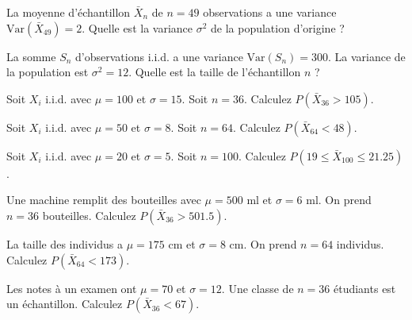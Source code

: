 \begin{exercicebox}
La moyenne d'échantillon $\bar{X}_n$ de $n=49$ observations a une variance $\text{Var}(\bar{X}_{49}) = 2$.
Quelle est la variance $\sigma^2$ de la population d'origine ?
\end{exercicebox}

\begin{exercicebox}
La somme $S_n$ d'observations i.i.d. a une variance $\text{Var}(S_n) = 300$. La variance de la population est $\sigma^2 = 12$.
Quelle est la taille de l'échantillon $n$ ?
\end{exercicebox}


\begin{exercicebox}
Soit $X_i$ i.i.d. avec $\mu=100$ et $\sigma=15$. Soit $n=36$.
Calculez $P(\bar{X}_{36} > 105)$.
\end{exercicebox}

\begin{exercicebox}
Soit $X_i$ i.i.d. avec $\mu=50$ et $\sigma=8$. Soit $n=64$.
Calculez $P(\bar{X}_{64} < 48)$.
\end{exercicebox}

\begin{exercicebox}
Soit $X_i$ i.i.d. avec $\mu=20$ et $\sigma=5$. Soit $n=100$.
Calculez $P(19 \le \bar{X}_{100} \le 21.25)$.
\end{exercicebox}

\begin{exercicebox}
Une machine remplit des bouteilles avec $\mu=500$ ml et $\sigma=6$ ml. On prend $n=36$ bouteilles.
Calculez $P(\bar{X}_{36} > 501.5)$.
\end{exercicebox}

\begin{exercicebox}
La taille des individus a $\mu=175$ cm et $\sigma=8$ cm. On prend $n=64$ individus.
Calculez $P(\bar{X}_{64} < 173)$.
\end{exercicebox}

\begin{exercicebox}
Les notes à un examen ont $\mu=70$ et $\sigma=12$. Une classe de $n=36$ étudiants est un échantillon.
Calculez $P(\bar{X}_{36} < 67)$.
\end{exercicebox}


